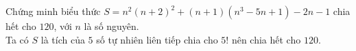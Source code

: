 \begin{ex}%
	Chứng minh biểu thức $S=n^2(n+2)^2+(n+1)(n^3-5n+1)-2n-1$ chia hết cho $120$, với $n$ là số nguyên.
	\\
Ta có $S$ là tích của $5$ số tự nhiên liên tiếp chia cho $5!$ nên chia hết cho $120$.
\end{ex}

